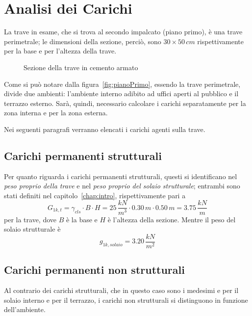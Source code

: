 \section{Analisi dei Carichi}\label{sec:loads}
 La trave in esame, che si trova al secondo impalcato (piano primo), è una trave perimetrale; le dimensioni della sezione, perciò, sono $30\times 50\,\si{cm}$ rispettivamente per la base e per l'altezza della trave.

\begin{figure}
 \centering
 \caption{Sezione della trave in cemento armato}
 \label{fig:beamSec}
\end{figure}

Come si può notare dalla figura~\ref{fig:pianoPrimo}, essendo la trave perimetrale, divide due ambienti: l'ambiente interno adibito ad uffici aperti al pubblico e il terrazzo esterno. Sarà, quindi,  necessario calcolare i carichi separatamente per la zona interna e per la zona esterna.

Nei seguenti paragrafi verranno elencati i carichi agenti sulla trave.

\subsection{Carichi permanenti strutturali}
Per quanto riguarda i carichi permanenti strutturali, questi si identificano nel \emph{peso proprio della trave} e nel \emph{peso proprio del solaio strutturale}; entrambi sono stati definiti nel capitolo~\ref{chap:intro}, rispettivamente pari a
\begin{equation*}
 G_{1k, t} = \gamma_{cls}\cdot B\cdot H = 25\,\dfrac{kN}{m^3} \cdot 0.30\,\si{m}\cdot 0.50\,\si{m} = 3.75\,\dfrac{kN}{m}
\end{equation*}
per la trave, dove $B$ è la base e $H$ è l'altezza della sezione. Mentre il peso del solaio strutturale è
\begin{equation*}
 g_{1k, solaio} = 3.20\,\dfrac{kN}{m^2}
\end{equation*}

\subsection{Carichi permanenti non strutturali}
Al contrario dei carichi strutturali, che in questo caso sono i medesimi e per il solaio interno e per il terrazzo, i carichi non strutturali si distinguono in funzione dell'ambiente.

